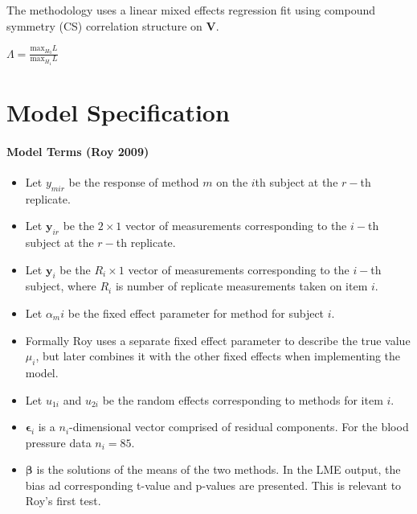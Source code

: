 \documentclass[12pt, a4paper]{report}
\theoremstyle{plain}
\theoremstyle{definition}
\theoremstyle{remark}
\begin{document}
		
		The methodology uses a linear mixed effects regression fit using
		compound symmetry (CS) correlation structure on \textbf{V}.
		
		
		$\Lambda = \frac{\mbox{max}_{H_{0}}L}{\mbox{max}_{H_{1}}L}$
	
	

\chapter{Model Specification}
		\subsubsection{Model Terms (Roy 2009)}
		\begin{itemize}
			\item Let $y_{mir}$ be the response of method $m$ on the $i$th subject
			at the $r-$th replicate.
			\item Let $\boldsymbol{y}_{ir}$ be the $2 \times 1$ vector of measurements
			corresponding to the $i-$th subject at the $r-$th replicate.
			\item Let $\boldsymbol{y}_{i}$ be the $R_i \times 1$ vector of
			measurements corresponding to the $i-$th subject, where $R_i$ is number of replicate measurements taken on item $i$.
			\item Let $\alpha_mi$ be the fixed effect parameter for method for subject $i$.
			\item Formally Roy uses a separate fixed effect parameter to describe the true value $\mu_i$, but later combines it with the other fixed effects when implementing the model.
			\item Let $u_{1i}$ and $u_{2i}$ be the random effects corresponding to methods for item $i$.
			
			\item $\boldsymbol{\epsilon}_{i}$ is a $n_{i}$-dimensional vector
			comprised of residual components. For the blood pressure data $n_{i} = 85$.
			
			\item $\boldsymbol{\beta}$ is the solutions of the means of the two methods. In the LME output, the bias ad corresponding
			t-value and p-values are presented. This is relevant to Roy's first test.\end{itemize}
		
		\newpage
		
\end{document}
